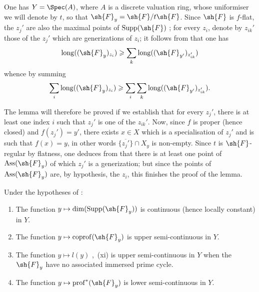 \begin{env}[12.2.1.3]
One has $Y=\Spec(A)$, where $A$ is a discrete valuation ring, whose uniformiser we will denote by $t$, so that $\sh{F}_y=\sh{F}/t\sh{F}$.
Since $\sh{F}$ is $f$-flat, the $z_j'$ are also the maximal points of $\operatorname{Supp}(\sh{F})$ ; for every $z_i$, denote by $z_{ik}'$ those of the $z_j'$ which are generizations of $z_i$; it follows from  that one has
\[
  \operatorname{long}((\sh{F}_y)_{z_i}) \geqslant \sum_k \operatorname{long}((\sh{F}_{y'})_{z_{ik}'})
\]
whence by summing
\[
  \sum_i \operatorname{long}((\sh{F}_y)_{z_i}) \geqslant \sum_i \sum_k \operatorname{long}((\sh{F}_{y'})_{z_{ik}'}).
\]

The lemma will therefore be proved if we establish that for every $z_j'$, there is at least one index $i$ such that $z_j'$ is one of the $z_{ik}'$.
Now, since $f$ is proper (hence closed) and $f(z_j')=y'$, there exists $x\in X$ which is a specialisation of $z_j'$ and is such that $f(x)=y$, in other words $\overline{\{z_j'\}}\cap X_y$ is non-empty.
Since $t$ is $\sh{F}$-regular by flatness, one deduces from  that there is at least one point of $\operatorname{Ass}(\sh{F}_y)$ of which $z_j'$ is a generization; but since the points of $\operatorname{Ass}(\sh{F}_y)$ are, by hypothesis, the $z_i$, this finishes the proof of the lemma.
\end{env}

\begin{corollary}[12.2.2]
\label{IV.12.2.2}
Under the hypotheses of :
\begin{enumerate}[label=(\roman*)]
  \item The function $y\mapsto\dim(\operatorname{Supp}(\sh{F}_y))$ is continuous (hence locally constant) in $Y$.
  \item The function $y\mapsto\operatorname{coprof}(\sh{F}_y)$  is upper semi-continuous in $Y$.
  \item The function $y\mapsto l(y)$ ,~(xi) is upper semi-continuous in $Y$ when the $\sh{F}_y$ have no associated immersed prime cycle.
  \item The function $y\mapsto\operatorname{prof}^*(\sh{F}_y)$  is lower semi-continuous in $Y$.
\end{enumerate}
\end{corollary}

